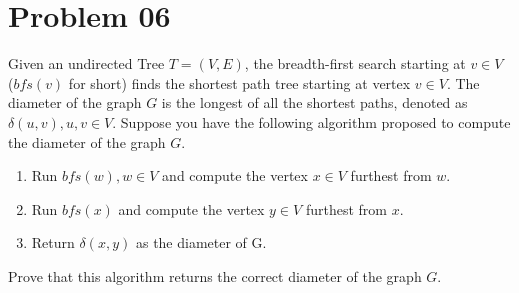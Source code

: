 \documentclass{article}
\begin{document}
\section{Problem 06}
Given an undirected Tree \(T = (V,E)\), the breadth-first search starting at \(v\in V\) (\(bfs(v)\) for short) finds the shortest path tree starting at vertex \(v \in V\). The diameter of the graph \(G\) is the longest of all the shortest paths, denoted as \(\delta(u,v), u, v \in V\).
Suppose you have the following algorithm proposed to compute the diameter of the graph \(G\).
\begin{enumerate}
    \item Run \(bfs(w), w \in V\) and compute the vertex \(x \in V\) furthest from \(w\).
    \item Run \(bfs(x)\) and compute the vertex \(y \in V\) furthest from \(x\).
    \item Return \(\delta(x,y)\) as the diameter of G.
\end{enumerate}

Prove that this algorithm returns the correct diameter of the graph \(G\).
\end{document}
